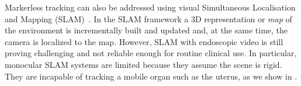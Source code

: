 Markerless tracking can also be addressed using visual Simultaneous Localisation and Mapping (SLAM)~\cite{Thrun2002Robotic,Mahmoud2017}. 
In the SLAM framework a 3D representation or \textit{map} of the environment is incrementally built and updated and, at the same time, the camera is localized \wrt to the map.
However, SLAM with endoscopic video is still proving challenging and not reliable enough for routine clinical use. %
In particular, monocular SLAM systems are limited because they assume the scene is rigid. They are incapable of tracking a mobile organ such as the uterus, as we show in .


